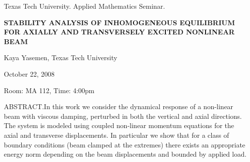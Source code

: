 \documentclass[oneside]{amsart}
\begin{document}
\begin{center}
Texas Tech University. Applied Mathematics Seminar.

\end{center}

\begin{center}

{\LARGE \uppercase{\textbf{Stability analysis of inhomogeneous equilibrium for axially and transversely excited nonlinear beam}}}

Kaya Yasemen, Texas Tech University

October 22, 2008

Room: MA 112, Time: 4:00pm

\end{center}


ABSTRACT.In this work we consider the dynamical response of a non-linear beam with viscous damping, perturbed in both the vertical and axial directions. The system is modeled using coupled non-linear momentum equations for the axial and transverse displacements. In particular we show that for a class of boundary conditions (beam clamped at the extremes) there exists an appropriate energy norm depending on the beam displacements and bounded by applied load.
\end{document}
